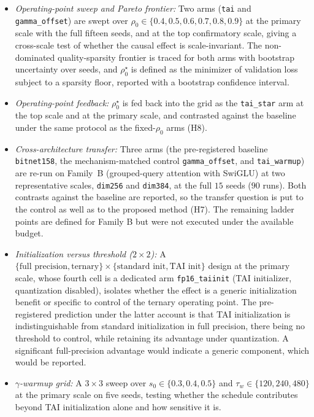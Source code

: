 \documentclass[final,5p,times,twocolumn]{elsarticle}
\theoremstyle{remark}
\newcommand{\rhoz}{\rho_{0}}
\begin{document}
\begin{itemize}
\item[] \textit{Operating-point sweep and Pareto frontier:} Two arms
(\texttt{tai} and \texttt{gamma\_offset}) are swept over
$\rhoz \in \{0.4,0.5,0.6,0.7,0.8,0.9\}$ at the primary scale with the full
fifteen seeds, and at the top confirmatory scale, giving a cross-scale test of
whether the causal effect is scale-invariant. The non-dominated
quality-sparsity frontier is traced for both arms with bootstrap uncertainty
over seeds, and $\rhoz^{\star}$ is defined as the minimizer of validation loss
subject to a sparsity floor, reported with a bootstrap confidence interval.

\item[] \textit{Operating-point feedback:} $\rhoz^{\star}$ is fed back into the
grid as the \texttt{tai\_star} arm at the top scale and at the primary scale,
and contrasted against the baseline under the same protocol as the fixed-$\rhoz$
arms (H8).

\item[] \textit{Cross-architecture transfer:} Three arms (the pre-registered
baseline \texttt{bitnet158}, the mechanism-matched control
\texttt{gamma\_offset}, and \texttt{tai\_warmup}) are re-run on Family~B
(grouped-query attention with SwiGLU) at two representative scales,
\texttt{dim256} and \texttt{dim384}, at the full $15$ seeds ($90$ runs). Both
contrasts against the baseline are reported, so the transfer question is put to
the control as well as to the proposed method (H7). The remaining ladder points
are defined for Family B but were not executed under the available budget.

\item[] \textit{Initialization versus threshold ($2\times 2$):} A
$\{\text{full precision}, \text{ternary}\} \times
\{\text{standard init}, \text{TAI init}\}$ design at the primary scale, whose
fourth cell is a dedicated arm \texttt{fp16\_taiinit} (TAI initializer,
quantization disabled), isolates
whether the effect is a generic initialization benefit or specific to control of
the ternary operating point. The pre-registered prediction under the latter
account is that TAI initialization is indistinguishable from standard
initialization in full precision, there being no threshold to control, while
retaining its advantage under quantization. A significant full-precision
advantage would indicate a generic component, which would be reported.

\item[] \textit{$\gamma$-warmup grid:} A $3\times 3$ sweep over
$s_{0}\in\{0.3,0.4,0.5\}$ and $\tau_{w}\in\{120,240,480\}$ at the primary scale
on five seeds, testing whether the schedule contributes beyond TAI
initialization alone and how sensitive it is.


\end{itemize}
\end{document}
